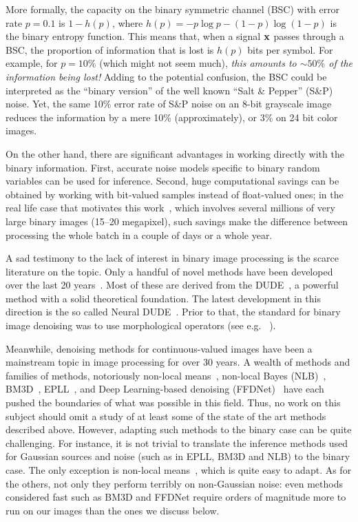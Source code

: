 \documentclass{article}
\begin{document}
More formally, the capacity on the binary symmetric channel (BSC) with error rate $p=0.1$ is $1-h(p)$,  where $h(p)=-p\log p-(1-p)\log (1-p)$ is the binary entropy function. This means that, when a signal $\vx$ passes through a BSC, the proportion of information that is lost is $h(p)$ bits per symbol. For example, for $p=10\%$ (which might not seem much), \emph{this amounts to $\sim 50\%$ of the information being lost!} Adding to the  potential confusion, the BSC could be interpreted as the ``binary version'' of the well known ``Salt \& Pepper'' (S\&P) noise. Yet, the same 10\% error rate of S\&P noise on an 8-bit grayscale image reduces the information by a mere 10\% (approximately), or 3\% on 24 bit color images. 

On the other hand, there are significant advantages in working directly with the binary information. First, accurate noise models specific to binary random variables can be used for inference. Second, huge computational savings can be obtained by working with bit-valued samples instead of float-valued ones; in the real life case that motivates this work~\cite{luisa}, which involves several millions of very large binary images (15--20 megapixel), such savings make the difference between processing the whole batch in a couple of days or a whole year. 

A sad testimony to the lack of interest in binary image processing is the scarce literature on the topic. Only a handful of novel methods have been developed over the last 20 years~\cite{dude-bin,shift-denoising,compression-denoising,mcmc-denoising}. Most of these are derived from the DUDE~\cite{dude-bin}, a powerful method with a solid theoretical foundation. The latest development in this direction is the so called Neural DUDE~\cite{neural-dude}.
Prior to that, the standard for binary image denoising was to use morphological operators (see e.g. ~\cite{morph}). 

Meanwhile, denoising methods for continuous-valued images have been a mainstream topic in image processing for over 30 years. A wealth of methods and families of methods, notoriously non-local means~\cite{nlm}, non-local Bayes (NLB)~\cite{nlbayes}, BM3D~\cite{bm3d}, EPLL~\cite{epll}, and Deep Learning-based denoising (FFDNet)~\cite{deep-learning} have each pushed the boundaries of what was possible in this field. Thus, no work on this subject should omit a study of at least some of the state of the art methods described above. However, adapting such methods to the binary case can be quite challenging. For instance, it is not trivial to translate the inference methods used for Gaussian sources and noise (such as in EPLL, BM3D and NLB) to the binary case. The only exception is non-local means~\cite{nlm}, which is quite easy to adapt. As for the others, not only they perform terribly on non-Gaussian noise: even methods considered fast such as BM3D and FFDNet require orders of magnitude more to run on our images than the ones we discuss below. 
\end{document}
